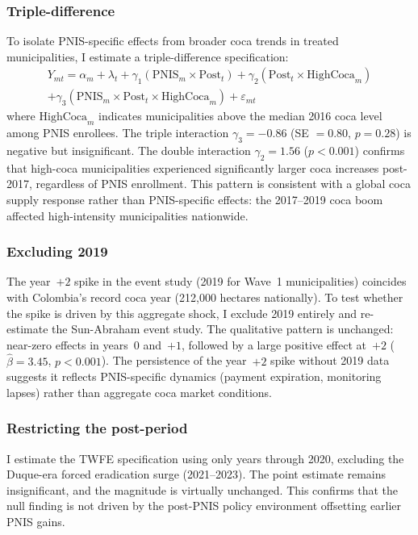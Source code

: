 \documentclass[12pt]{article}
\begin{document}
\subsubsection*{Triple-difference} To isolate PNIS-specific effects from broader coca trends in treated municipalities, I estimate a triple-difference specification:
\begin{multline}
Y_{mt} = \alpha_m + \lambda_t + \gamma_1(\text{PNIS}_{m} \times \text{Post}_t) + \gamma_2(\text{Post}_t \times \text{HighCoca}_m) \\
+ \gamma_3(\text{PNIS}_m \times \text{Post}_t \times \text{HighCoca}_m) + \varepsilon_{mt}
\end{multline}
where $\text{HighCoca}_m$ indicates municipalities above the median 2016 coca level among PNIS enrollees. The triple interaction $\gamma_3 = -0.86$ (SE $= 0.80$, $p = 0.28$) is negative but insignificant. The double interaction $\gamma_2 = 1.56$ ($p < 0.001$) confirms that high-coca municipalities experienced significantly larger coca increases post-2017, regardless of PNIS enrollment. This pattern is consistent with a global coca supply response rather than PNIS-specific effects: the 2017--2019 coca boom affected high-intensity municipalities nationwide.

\subsubsection*{Excluding 2019} The year~$+2$ spike in the event study (2019 for Wave~1 municipalities) coincides with Colombia's record coca year (212,000 hectares nationally). To test whether the spike is driven by this aggregate shock, I exclude 2019 entirely and re-estimate the Sun-Abraham event study. The qualitative pattern is unchanged: near-zero effects in years~0 and~$+1$, followed by a large positive effect at~$+2$ ($\hat{\beta} = 3.45$, $p < 0.001$). The persistence of the year~$+2$ spike without 2019 data suggests it reflects PNIS-specific dynamics (payment expiration, monitoring lapses) rather than aggregate coca market conditions.

\subsubsection*{Restricting the post-period} I estimate the TWFE specification using only years through 2020, excluding the Duque-era forced eradication surge (2021--2023). The point estimate remains insignificant, and the magnitude is virtually unchanged. This confirms that the null finding is not driven by the post-PNIS policy environment offsetting earlier PNIS gains.
\end{document}
